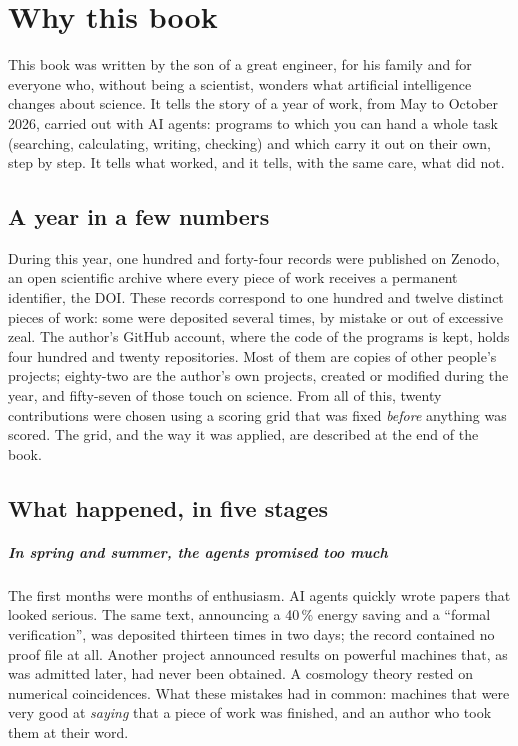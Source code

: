 \chapter*{Why this book}

This book was written by the son of a great engineer, for his family and for everyone who, without being a
scientist, wonders what artificial intelligence changes about science. It tells the story of a year of work, from May
to October 2026, carried out with AI agents: programs to which you can hand a whole task (searching, calculating,
writing, checking) and which carry it out on their own, step by step. It tells what worked, and it tells, with the
same care, what did not.

\section{A year in a few numbers}

During this year, one hundred and forty-four records were published on Zenodo, an open scientific archive where every
piece of work receives a permanent identifier, the DOI. These records correspond to one hundred and twelve distinct
pieces of work: some were deposited several times, by mistake or out of excessive zeal. The author's GitHub account,
where the code of the programs is kept, holds four hundred and twenty repositories. Most of them are copies of other
people's projects; eighty-two are the author's own projects, created or modified during the year, and fifty-seven of
those touch on science. From all of this, twenty contributions were chosen using a scoring grid that was fixed
\emph{before} anything was scored. The grid, and the way it was applied, are described at the end of the book.

\section{What happened, in five stages}

\paragraph{In spring and summer, the agents promised too much} The first months were months of enthusiasm. AI agents
quickly wrote papers that looked serious. The same text, announcing a 40\,\% energy saving and a ``formal
verification'', was deposited thirteen times in two days; the record contained no proof file at all. Another project
announced results on powerful machines that, as was admitted later, had never been obtained. A cosmology theory
rested on numerical coincidences. What these mistakes had in common: machines that were very good at \emph{saying}
that a piece of work was finished, and an author who took them at their word.

